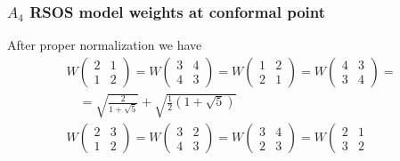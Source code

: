 \documentclass[pdftex]{beamer}
\theoremstyle{definition} \newtheorem{Def}{Definition}
\begin{document}
\begin{frame}
\frametitle{$A_4$ RSOS model weights at conformal point}
After proper normalization we have
\begin{equation}
     \label{eq:12}
     \begin{array}{l}
       W\left(                                          
         \begin{array}{cc}
           2 & 1 \\
           1 & 2
         \end{array}
       \right)=
       W\left(
         \begin{array}{cc}
           3 & 4 \\
           4 & 3
         \end{array}
       \right)=   W\left(                                         
         \begin{array}{cc}
           1 & 2 \\
           2 & 1
         \end{array}
       \right)= 
       W\left(                                                  
         \begin{array}{cc}
           4 & 3 \\
           3 & 4
         \end{array}
       \right)=\\\quad=\sqrt{\frac{2}{1+\sqrt{5}}}+\sqrt{\frac{1}{2}\left(1+\sqrt{5}\right)}\\
 W\left(                                      
           \begin{array}{cc}
             2 & 3 \\
             1 & 2
           \end{array}
         \right)=
         W\left(                                         
           \begin{array}{cc}
             3 & 2 \\
             4 & 3
           \end{array}
         \right)=    W\left(                                         
           \begin{array}{cc}
             3 & 4 \\
             2 & 3
           \end{array}
         \right)=    W\left(                                         
           \begin{array}{cc}
             2 & 1 \\
             3 & 2
           \end{array}

\end{array}
\end{equation}
\end{frame}
\end{document}
